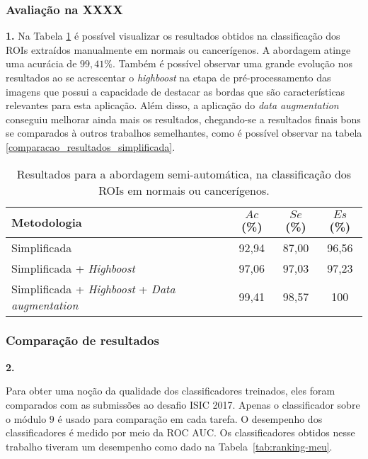 \subsubsection{Avaliação na XXXX}

\textbf{1. }
Na Tabela \ref{resultados_simplificados} é possível visualizar os resultados obtidos na classificação dos ROIs extraídos manualmente em normais ou cancerígenos. A abordagem atinge uma acurácia de $99,41\%$. 
Também é possível observar uma grande evolução nos resultados ao se acrescentar o \textit{highboost} na etapa de pré-processamento das imagens que possui a capacidade de destacar as bordas que são características relevantes para esta aplicação. 
Além disso, a aplicação do \textit{data augmentation} conseguiu melhorar ainda mais os resultados, chegando-se a resultados finais bons se comparados à outros trabalhos semelhantes, como é possível observar na tabela \ref{comparacao_resultados_simplificada}.

\begin{table}[h]
    \centering
    \caption{Resultados para a abordagem semi-automática, na classificação dos ROIs em normais ou cancerígenos.}
    \begin{tabular}{l|ccc}
    Metodologia & $Ac$(\%) & $Se$(\%) & $Es$(\%)\\ 
    \hline                         
    \hline                         
    Simplificada & 92,94 & 87,00 & 96,56 \\
    Simplificada + \textit{Highboost} & 97,06 & 97,03 & 97,23 \\ 
    Simplificada + \textit{Highboost} + \textit{Data augmentation} & 99,41 & 98,57 & 100 \\
    \end{tabular}
    \label{resultados_simplificados}
\end{table}

\subsubsection{Comparação de resultados}

\textbf{2. }

Para obter uma noção da qualidade dos classificadores treinados, eles foram comparados com as submissões ao desafio ISIC 2017. 
Apenas o classificador sobre o módulo $9$ é usado para comparação em cada tarefa. 
O desempenho dos classificadores é medido por meio da ROC AUC.
Os classificadores obtidos nesse trabalho tiveram um desempenho como dado na Tabela~\ref{tab:ranking-meu}.

